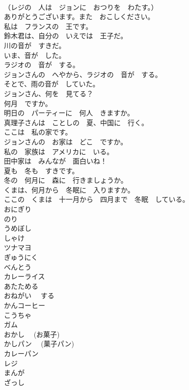 \documentclass[8pt]{extreport}
\begin{document}
\begin{CJK}{UTF8}{min}
\\	（レジの　人は　ジョンに　おつりを　わたす。）	
\\	ありがとうございます。また　おこしください。	
\\	私は　フランスの　王です。	
\\	鈴木君は、自分の　いえでは　王子だ。	
\\	川の音が　すきだ。	
\\	いま、音が　した。	
\\	ラジオの　音が　する。	
\\	ジョンさんの　へやから、ラジオの　音が　する。	
\\	そとで、雨の音が　していた。	
\\	ジョンさん、何を　見てる？	
\\	何月　ですか。	
\\	明日の　パーティーに　何人　きますか。	
\\	真理子さんは　ことしの　夏、中国に　行く。	
\\	ここは　私の家です。	
\\	ジョンさんの　お家は　どこ　ですか。	
\\	私の　家族は　アメリカに　いる。	
\\	田中家は　みんなが　面白いね！	
\\	夏も　冬も　すきです。	
\\	冬の　何月に　森に　行きましょうか。	
\\	くまは、何月から　冬眠に　入りますか。	
\\	ここの　くまは　十一月から　四月まで　冬眠　している。	
\\	おにぎり	
\\	のり	
\\	うめぼし	
\\	しゃけ	
\\	ツナマヨ	
\\	ぎゅうにく	
\\	べんとう	
\\	カレーライス	
\\	あたためる	
\\	おねがい　 する	
\\	かんコーヒー	
\\	こうちゃ	
\\	ガム	
\\	おかし　 (お菓子)	
\\	かしパン　 (菓子パン)	
\\	カレーパン	
\\	レジ	
\\	まんが	
\\	ざっし	

\end{CJK}
\end{document}
